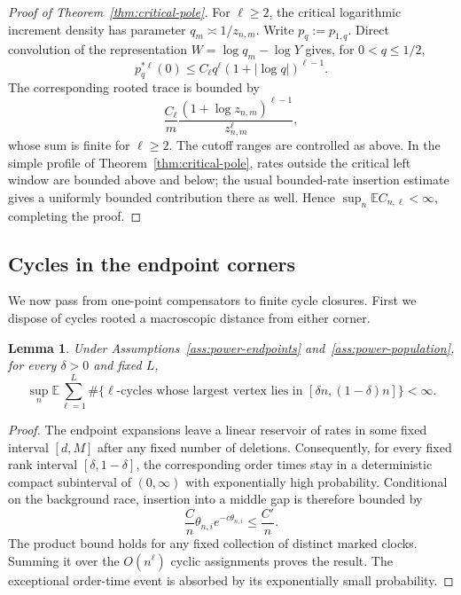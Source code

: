 \documentclass[11pt]{article}
\newtheorem{lemma}[theorem]{Lemma}
\theoremstyle{remark}
\theoremstyle{plain}
\newcommand{\E}{\mathbb E}
\begin{document}
\begin{proof}[Proof of Theorem~\ref{thm:critical-pole}]
For $\ell\ge2$, the critical logarithmic increment density has parameter
$q_m\asymp1/z_{n,m}$.  Write $p_q:=p_{1,q}$.  Direct convolution of the
representation $W=\log q_m-\log Y$ gives, for $0<q\le1/2$,
\[
 p_q^{*\ell}(0)\le C_\ell q^\ell
 (1+|\log q|)^{\ell-1}.
\]
The corresponding rooted trace is bounded by
\[
 \frac{C_\ell}{m}
 \frac{(1+\log z_{n,m})^{\ell-1}}{z_{n,m}^\ell},
\]
whose sum is finite for $\ell\ge2$.  The cutoff ranges are controlled as
above.  In the simple profile of Theorem~\ref{thm:critical-pole}, rates
outside the critical left window are bounded above and below; the usual
bounded-rate insertion estimate gives a uniformly bounded contribution
there as well.  Hence $\sup_n\E C_{n,\ell}<\infty$, completing the proof.
\end{proof}

\subsection{Cycles in the endpoint corners}

We now pass from one-point compensators to finite cycle closures.  First we
dispose of cycles rooted a macroscopic distance from either corner.

\begin{lemma}\label{lem:power-compact-cycles}
Under Assumptions~\ref{ass:power-endpoints}
and~\ref{ass:power-population}, for every $\delta>0$ and fixed $L$,
\begin{equation}\label{eq:power-compact-cycle-bound}
 \sup_n\E\sum_{\ell=1}^L
 \#\{\ell\text{-cycles whose largest vertex lies in }
 [\delta n,(1-\delta)n]\}<\infty.
\end{equation}
\end{lemma}

\begin{proof}
The endpoint expansions leave a linear reservoir of rates in some fixed
interval $[d,M]$ after any fixed number of deletions.  Consequently, for
every fixed rank interval $[\delta,1-\delta]$, the corresponding order
times stay in a deterministic compact subinterval of $(0,\infty)$ with
exponentially high probability.
Conditional on the background race, insertion into a middle gap is therefore
bounded by
\[
 \frac Cn\theta_{n,i}e^{-c\theta_{n,i}}\le\frac{C'}n.
\]
The product bound holds for any fixed collection of distinct marked clocks.
Summing it over the $O(n^\ell)$ cyclic assignments proves the result.  The
exceptional order-time event is absorbed by its exponentially small
probability.
\end{proof}
\end{document}
